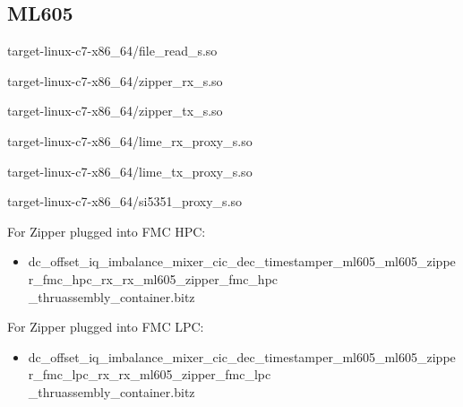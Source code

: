 \documentclass{article}
\begin{document}
\subsection{ML605}
	\begin{itemize}
	\begin{minipage}[t]{.5\textwidth}
	\item target-linux-c7-x86\_64/file\_read\_s.so
	\item target-linux-c7-x86\_64/zipper\_rx\_s.so
	\item target-linux-c7-x86\_64/zipper\_tx\_s.so
	\end{minipage}
	\begin{minipage}[t]{.5\textwidth}
	\item target-linux-c7-x86\_64/lime\_rx\_proxy\_s.so
	\item target-linux-c7-x86\_64/lime\_tx\_proxy\_s.so
	\item target-linux-c7-x86\_64/si5351\_proxy\_s.so
	\end{minipage}
	\end{itemize}
	For Zipper plugged into FMC HPC:
	\begin{itemize}
		\item dc\_offset\_iq\_imbalance\_mixer\_cic\_dec\_timestamper\_ml605\_ml605\_zipper\_fmc\_hpc\_rx\_rx\_ml605\_zipper\_fmc\_hpc\\ \_thruassembly\_container.bitz
	\end{itemize}
	\noindent For Zipper plugged into FMC LPC:
	\begin{itemize}
		\item dc\_offset\_iq\_imbalance\_mixer\_cic\_dec\_timestamper\_ml605\_ml605\_zipper\_fmc\_lpc\_rx\_rx\_ml605\_zipper\_fmc\_lpc\\ \_thruassembly\_container.bitz
	\end{itemize}
\end{document}
